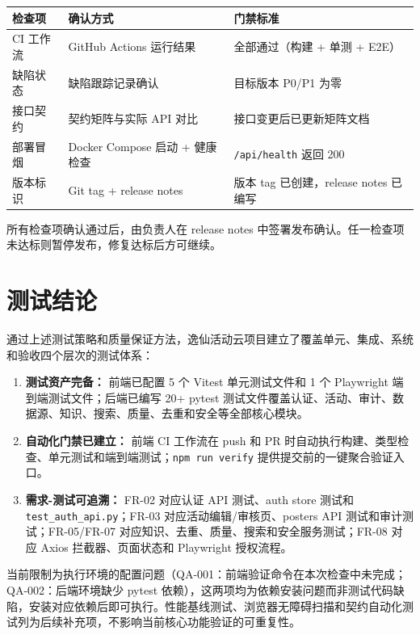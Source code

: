 \documentclass[12pt,a4paper]{ctexart}
\begin{document}
\noindent\begin{tabularx}{\textwidth}{p{4cm}Y p{4cm}}
\toprule 检查项 & 确认方式 & 门禁标准 \\\midrule
CI 工作流 & GitHub Actions 运行结果 & 全部通过（构建 + 单测 + E2E） \\
缺陷状态 & 缺陷跟踪记录确认 & 目标版本 P0/P1 为零 \\
接口契约 & 契约矩阵与实际 API 对比 & 接口变更后已更新矩阵文档 \\
部署冒烟 & Docker Compose 启动 + 健康检查 & \texttt{/api/health} 返回 200 \\
版本标识 & Git tag + release notes & 版本 tag 已创建，release notes 已编写 \\
\bottomrule
\end{tabularx}
所有检查项确认通过后，由负责人在 release notes 中签署发布确认。任一检查项未达标则暂停发布，修复达标后方可继续。

\section{测试结论}
通过上述测试策略和质量保证方法，逸仙活动云项目建立了覆盖单元、集成、系统和验收四个层次的测试体系：
\begin{enumerate}
\item \textbf{测试资产完备：} 前端已配置 5 个 Vitest 单元测试文件和 1 个 Playwright 端到端测试文件；后端已编写 20+ pytest 测试文件覆盖认证、活动、审计、数据源、知识、搜索、质量、去重和安全等全部核心模块。
\item \textbf{自动化门禁已建立：} 前端 CI 工作流在 push 和 PR 时自动执行构建、类型检查、单元测试和端到端测试；\texttt{npm run verify} 提供提交前的一键聚合验证入口。
\item \textbf{需求-测试可追溯：} FR-02 对应认证 API 测试、auth store 测试和 \texttt{test\_auth\_api.py}；FR-03 对应活动编辑/审核页、posters API 测试和审计测试；FR-05/FR-07 对应知识、去重、质量、搜索和安全服务测试；FR-08 对应 Axios 拦截器、页面状态和 Playwright 授权流程。
\end{enumerate}
当前限制为执行环境的配置问题（QA-001：前端验证命令在本次检查中未完成；QA-002：后端环境缺少 pytest 依赖），这两项均为依赖安装问题而非测试代码缺陷，安装对应依赖后即可执行。性能基线测试、浏览器无障碍扫描和契约自动化测试列为后续补充项，不影响当前核心功能验证的可重复性。
\end{document}
